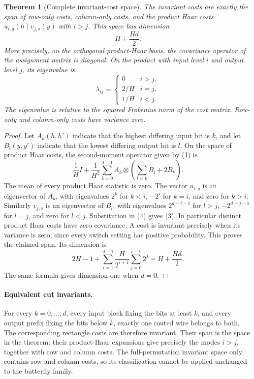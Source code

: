 \documentclass[11pt]{article}
\newtheorem{theorem}{Theorem}
\begin{document}
\begin{theorem}[Complete invariant-cost space]
The invariant costs are exactly the span of row-only costs,
column-only costs, and the product Haar costs
$u_{i,g}(h)v_{j,s}(y)$ with $i>j$. This space has dimension
\[
                         H+\frac{Hd}{2}.                    \tag{2}
\]
More precisely, on the orthogonal product-Haar basis, the covariance
operator of the assignment matrix is diagonal. On the product with
input level $i$ and output level $j$, its eigenvalue is
\[
 \lambda_{ij}=\begin{cases}
 0&i>j,\\2/H&i=j,\\1/H&i<j.
 \end{cases}                                                 \tag{3}
\]
The eigenvalue is relative to the squared Frobenius norm of the cost
matrix. Row-only and column-only costs have variance zero.
\end{theorem}
\begin{proof}
Let $A_k(h,h')$ indicate that the highest differing input bit is $k$,
and let $B_l(y,y')$ indicate that the lowest differing output bit is
$l$. On the space of product Haar costs, the second-moment operator
given by (1) is
\[
 \frac1H I+\frac1{H^2}\sum_{k=0}^{d-1}
 A_k\otimes\left(\sum_{l<k}B_l+2B_k\right).             \tag{4}
\]
The mean of every product Haar statistic is zero. The vector
$u_{i,g}$ is an eigenvector of $A_k$, with eigenvalues $2^k$ for
$k<i$, $-2^i$ for $k=i$, and zero for $k>i$.
Similarly $v_{j,s}$ is an eigenvector of $B_l$, with eigenvalues
$2^{d-l-1}$ for $l>j$, $-2^{d-j-1}$ for $l=j$, and zero for $l<j$.
Substitution in (4) gives (3). In particular distinct product Haar
costs have zero covariance. A cost is invariant precisely when its
variance is zero, since every switch setting has positive probability.
This proves the claimed span. Its dimension is
\[
 2H-1+\sum_{i=1}^{d-1}\frac{H}{2^{i+1}}
                      \sum_{j=0}^{i-1}2^j
 =H+\frac{Hd}{2}.
\]
The same formula gives dimension one when $d=0$.
\end{proof}

\paragraph{Equivalent cut invariants.}
For every $k=0,\ldots,d$, every input block fixing the bits at least
$k$, and every output prefix fixing the bits below $k$, exactly one
routed wire belongs to both. The corresponding rectangle costs are
therefore invariant. Their span is the space in the theorem: their
product-Haar expansions give precisely the modes $i>j$, together
with row and column costs. The full-permutation invariant space only
contains row and column costs, so its classification cannot be applied
unchanged to the butterfly family.
\end{document}
